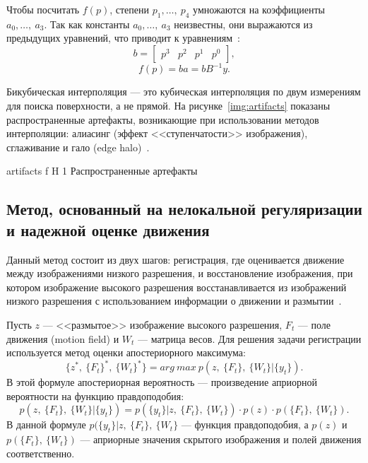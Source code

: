 \documentclass{bmstu}
\begin{document}
Чтобы посчитать $f(p)$, степени $p_1,\dots,~p_4$ умножаются на коэффициенты $a_0,\dots,~a_3$. 
Так как константы $a_0,\dots,~a_3$ неизвестны, они выражаются из предыдущих уравнений, что приводит к уравнениям~\cite{Bavenstrand2021}:
\begin{equation}
b = \begin{bmatrix}
p^3 & p^2 & p^1 & p^0
\end{bmatrix},
\end{equation}
\begin{equation}
f(p) = ba = bB^{-1}y.
\end{equation}

Бикубическая интерполяция --- это кубическая интерполяция по двум измерениям для поиска поверхности, а не прямой. 
На рисунке~\ref{img:artifacts} показаны распространенные артефакты, возникающие при использовании методов интерполяции: алиасинг (эффект <<ступенчатости>> изображения), сглаживание и гало (edge halo)~\cite{Bavenstrand2021}.

    {artifacts}
    {f}
    {H}
    {1\textwidth}
    {Распространенные артефакты~\cite{Bavenstrand2021}}

\subsection{Метод, основанный на нелокальной регуляризации и надежной оценке движения}

Данный метод состоит из двух шагов: регистрация, где оценивается движение между изображениями низкого разрешения, и восстановление изображения, при котором изображение высокого разрешения восстанавливается из изображений низкого разрешения с использованием информации о движении и размытии~\cite{Jian2014}.

Пусть $z$ --- <<размытое>> изображение высокого разрешения, $F_t$ --- поле движения (motion field) и $W_t$ --- матрица весов. 
Для решения задачи регистрации используется метод оценки апостериорного максимума:
\begin{equation}
\{z^{*},~\{F_t\}^{*},~\{W_t\}^{*}\} = arg~max~p(z,~\{F_t\},~\{W_t\}|\{y_t\}).
\end{equation}
В этой формуле апостериорная вероятность --- произведение априорной вероятности на функцию правдоподобия:
\begin{equation}
p(z,~\{F_t\},~\{W_t\}|\{y_t\}) = p(\{y_t\}|z,~\{F_t\},~\{W_t\}) \cdot p(z) \cdot p(\{F_t\},~\{W_t\}).
\end{equation}
В данной формуле $p(\{y_t\}|z,~\{F_t\},~\{W_t\}$ --- функция правдоподобия, а $p(z)$ и $p(\{F_t\},~\{W_t\})$ --- априорные значения скрытого изображения и полей движения соответственно.
\end{document}
